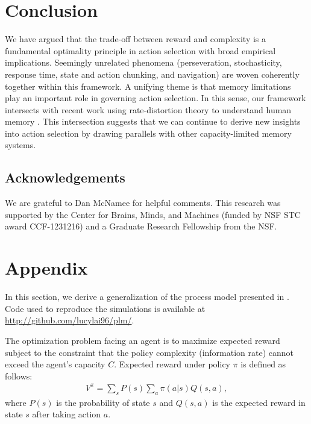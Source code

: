 \documentclass[11pt]{article}
\begin{document}
\section{Conclusion}

We have argued that the trade-off between reward and complexity is a fundamental optimality principle in action selection with broad empirical implications. Seemingly unrelated phenomena (perseveration, stochasticity, response time, state and action chunking, and navigation) are woven coherently together within this framework. A unifying theme is that memory limitations play an important role in governing action selection. In this sense, our framework intersects with recent work using rate-distortion theory to understand human memory \citep{bates19,bates20,sims12,sims16,nagy20}. This intersection suggests that we can continue to derive new insights into action selection by drawing parallels with other capacity-limited memory systems.

\subsection*{Acknowledgements}

We are grateful to Dan McNamee for helpful comments. This research was supported by the Center for Brains, Minds, and Machines (funded by NSF STC award CCF-1231216) and a Graduate Research Fellowship from the NSF.




\newpage

\section*{Appendix}

In this section, we derive a generalization of the process model presented in \citet{gershmanlai20}. Code used to reproduce the simulations is available at \url{http://github.com/lucylai96/plm/}.

The optimization problem facing an agent is to maximize expected reward subject to the constraint that the policy complexity (information rate) cannot exceed the agent's capacity $C$. Expected reward under policy $\pi$ is defined as follows:
\begin{align} 
V^\pi= \sum_{s}P(s)\sum_{a}\pi(a|s)Q(s,a),
\end{align}
where $P(s)$ is the probability of state $s$ and $Q(s,a)$ is the expected reward in state $s$ after taking action $a$.
\end{document}
